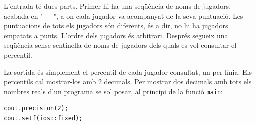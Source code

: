 \Input

L'entrada té dues parts. Primer hi ha una seqüència de noms de jugadors, acabada en "\verb|---|", a on cada jugador va acompanyat de la seva puntuació. Les puntuacions de tots els jugadors són diferents, és a dir, no hi ha jugadors empatats a punts. L'ordre dels jugadors és arbitrari. Després segueix una seqüència sense sentinella de noms de jugadors dels quals es vol consultar el percentil. 

\Output

La sortida és simplement el percentil de cada jugador consultat, un per línia. Els percentils cal mostrar-los amb 2 decimals. Per mostrar dos decimals amb tots els nombres reals d'un programa se sol posar, al principi de la funció \verb|main|:

\begin{verbatim}
cout.precision(2);
cout.setf(ios::fixed);
\end{verbatim}

\SampleTwoCol
